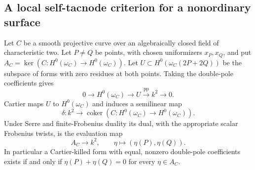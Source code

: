 \subsection{A local self-tacnode criterion for a nonordinary surface}
\label{subsec:ss-self-tacnode}

\begin{lemma}
\label{lem:ss-two-point-Cartier}
Let $C$ be a smooth projective curve over an algebraically closed field
of characteristic two. Let $P\ne Q$ be points, with chosen uniformizers
$x_P,x_Q$, and put $A_C=\ker(C:H^0(\omega_C)\to H^0(\omega_C))$.
Let $U\subset H^0(\omega_C(2P+2Q))$ be the subspace of forms with
zero residues at both points. Taking the double-pole coefficients gives
\[
 0\longrightarrow H^0(\omega_C)\longrightarrow U
   \xrightarrow{\mathrm{pp}}k^2\longrightarrow0.
\]
Cartier maps $U$ to $H^0(\omega_C)$ and induces a semilinear map
\[
 \delta:k^2\longrightarrow\operatorname{coker}
       (C:H^0(\omega_C)\to H^0(\omega_C)).
\]
Under Serre and finite-Frobenius duality its dual, with the appropriate
scalar Frobenius twists, is the evaluation map
\[
          A_C\longrightarrow k^2,
          \qquad\eta\longmapsto(\eta(P),\eta(Q)).
\]
In particular a Cartier-killed form with equal, nonzero double-pole
coefficients exists if and only if
$\eta(P)+\eta(Q)=0$ for every $\eta\in A_C$.
\end{lemma}
